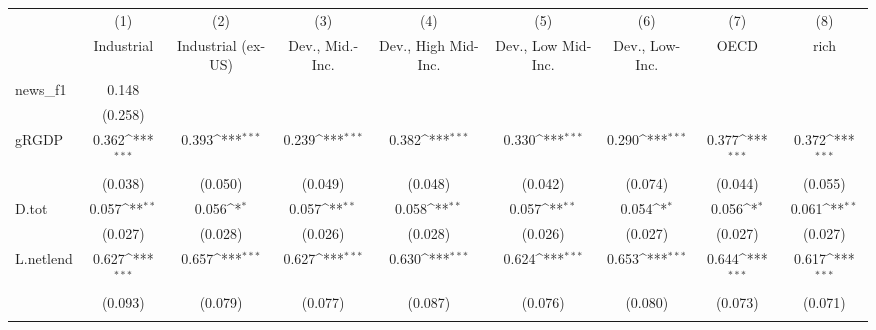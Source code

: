 {
\def\sym#1{\ifmmode^{#1}\else\(^{#1}\)\fi}
\begin{tabular}{l*{8}{c}}
\toprule
            &\multicolumn{1}{c}{(1)}&\multicolumn{1}{c}{(2)}&\multicolumn{1}{c}{(3)}&\multicolumn{1}{c}{(4)}&\multicolumn{1}{c}{(5)}&\multicolumn{1}{c}{(6)}&\multicolumn{1}{c}{(7)}&\multicolumn{1}{c}{(8)}\\
            &\multicolumn{1}{c}{Industrial}&\multicolumn{1}{c}{Industrial (ex-US)}&\multicolumn{1}{c}{Dev., Mid.-Inc.}&\multicolumn{1}{c}{Dev., High Mid-Inc.}&\multicolumn{1}{c}{Dev., Low Mid-Inc.}&\multicolumn{1}{c}{Dev., Low-Inc.}&\multicolumn{1}{c}{OECD}&\multicolumn{1}{c}{rich}\\
\midrule
news\_f1     &       0.148         &                     &                     &                     &                     &                     &                     &                     \\
            &     (0.258)         &                     &                     &                     &                     &                     &                     &                     \\
\addlinespace
gRGDP       &       0.362\sym{***}&       0.393\sym{***}&       0.239\sym{***}&       0.382\sym{***}&       0.330\sym{***}&       0.290\sym{***}&       0.377\sym{***}&       0.372\sym{***}\\
            &     (0.038)         &     (0.050)         &     (0.049)         &     (0.048)         &     (0.042)         &     (0.074)         &     (0.044)         &     (0.055)         \\
\addlinespace
D.tot       &       0.057\sym{**} &       0.056\sym{*}  &       0.057\sym{**} &       0.058\sym{**} &       0.057\sym{**} &       0.054\sym{*}  &       0.056\sym{*}  &       0.061\sym{**} \\
            &     (0.027)         &     (0.028)         &     (0.026)         &     (0.028)         &     (0.026)         &     (0.027)         &     (0.027)         &     (0.027)         \\
\addlinespace
L.netlend   &       0.627\sym{***}&       0.657\sym{***}&       0.627\sym{***}&       0.630\sym{***}&       0.624\sym{***}&       0.653\sym{***}&       0.644\sym{***}&       0.617\sym{***}\\
            &     (0.093)         &     (0.079)         &     (0.077)         &     (0.087)         &     (0.076)         &     (0.080)         &     (0.073)         &     (0.071)         \\
\addlinespace

\end{tabular}}
